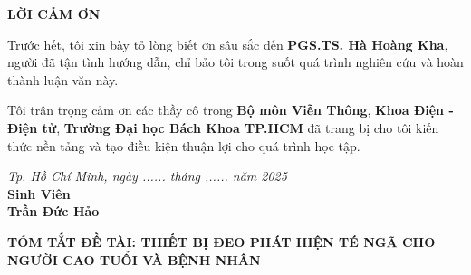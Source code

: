 \documentclass[a4paper,12pt]{report}
\begin{document}
	\begin{center}
		\vspace*{3cm}  %
		
		\textbf{\fontsize{16}{19}\selectfont LỜI CẢM ƠN}
		
		\vspace{2cm}  %
	\end{center}
	
	\noindent
	\begin{minipage}{\linewidth}
		\setlength{\parindent}{1.5cm}  %
		\setlength{\parskip}{6pt}      %
		\fontsize{13}{15}\selectfont   %
		
		Trước hết, tôi xin bày tỏ lòng biết ơn sâu sắc đến \textbf{PGS.TS. Hà Hoàng Kha}, người đã tận tình hướng dẫn, chỉ bảo tôi trong suốt quá trình nghiên cứu và hoàn thành luận văn này.
		
		Tôi trân trọng cảm ơn các thầy cô trong \textbf{Bộ môn Viễn Thông}, \textbf{Khoa Điện - Điện tử}, \textbf{Trường Đại học Bách Khoa TP.HCM} đã trang bị cho tôi kiến thức nền tảng và tạo điều kiện thuận lợi cho quá trình học tập.
		
		
		\vspace{1.5cm}
		\begin{flushright}
			\begin{minipage}{0.5\textwidth}
				\centering
				\textit{Tp. Hồ Chí Minh, ngày ...... tháng ...... năm 2025} \\
				\vspace{1cm}
				\textbf{Sinh Viên} \\
				\vspace{0.5cm}
				\textbf{Trần Đức Hảo}
			\end{minipage}
		\end{flushright}
	\end{minipage}
	
	\vfill
	\newpage
	
	\begingroup
	\let\clearpage\relax
	\setcounter{tocdepth}{1}
	\tableofcontents
	\endgroup
	
	\clearpage
	\clearpage
	
	
	
	\begin{center}
		\textbf{TÓM TẮT ĐỀ TÀI: THIẾT BỊ ĐEO PHÁT HIỆN TÉ NGÃ CHO NGƯỜI CAO TUỔI VÀ BỆNH NHÂN}
	\end{center}
	\setlength{\parindent}{1cm}
	
\end{document}
